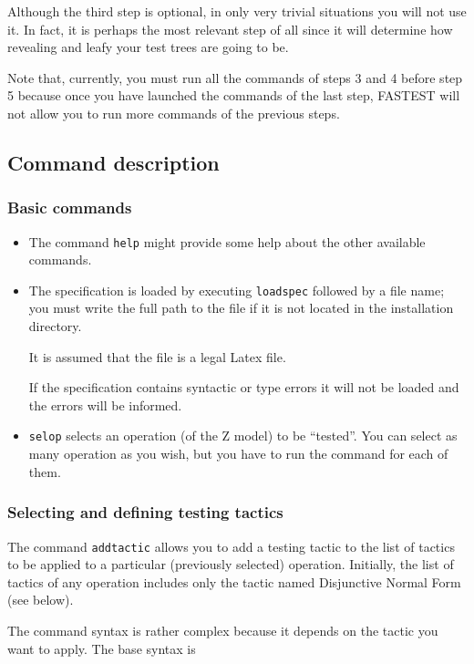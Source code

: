 Although the third step is optional, in only very trivial situations you will not use it. In fact, it is perhaps the most relevant step of all since it will determine how revealing and leafy your test trees are going to be.

Note that, currently, you must run all the commands of steps 3 and 4 before step 5 because once you have launched the commands of the last step, FASTEST will not allow you to run more commands of the previous steps.

\subsection{Command description}

\subsubsection{Basic commands}

\begin{itemize}
\item The command \verb+help+ might provide some help about the other available commands.

\item The specification is loaded by executing \verb+loadspec+ followed by a file name; you must write the full path to the file if it is not located in the installation directory. 

It is assumed that the file is a legal Latex file. 

If the specification contains syntactic or type errors it will not be loaded and the errors will be informed.

\item \verb+selop+ selects an operation (of the Z model) to be ``tested''. You can select as many operation as you wish, but you have to run the command for each of them.
\end{itemize}

\subsubsection{Selecting and defining testing tactics}

The command \verb+addtactic+ allows you to add a testing tactic to the list of tactics to be applied to a particular (previously selected) operation. Initially, the list of tactics of any operation includes only the tactic named Disjunctive Normal Form (see below).

The command syntax is rather complex because it depends on the tactic you want to apply. The base syntax is 

